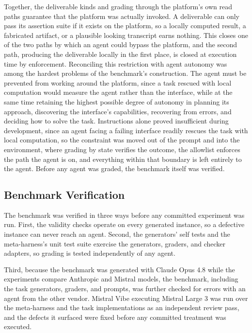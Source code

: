 \documentclass[
english,                 %
bibtex,                  %
]{kththesis}
\numberwithin{listing}{chapter}
\begin{document}
Together, the deliverable kinds and grading through the platform's own read paths guarantee that the platform was actually invoked. A deliverable can only pass its assertion suite if it exists on the platform, so a locally computed result, a fabricated artifact, or a plausible looking transcript earns nothing. This closes one of the two paths by which an agent could bypass the platform, and the second path, producing the deliverable locally in the first place, is closed at execution time by enforcement. Reconciling this restriction with agent autonomy was among the hardest problems of the benchmark's construction. The agent must be prevented from working around the platform, since a task rescued with local computation would measure the agent rather than the interface, while at the same time retaining the highest possible degree of autonomy in planning its approach, discovering the interface's capabilities, recovering from errors, and deciding how to solve the task. Instructions alone proved insufficient during development, since an agent facing a failing interface readily rescues the task with local computation, so the constraint was moved out of the prompt and into the environment, where grading by state verifies the outcome, the allowlist enforces the path the agent is on, and everything within that boundary is left entirely to the agent. Before any agent was graded, the benchmark itself was verified.

\subsection{Benchmark Verification}
\label{sec:method_benchmark_verification}
\glsresetall

The benchmark was verified in three ways before any committed experiment was run. First, the validity checks operate on every generated instance, so a defective instance can never reach an agent. Second, the generators' self tests and the meta-harness's unit test suite exercise the generators, graders, and checker adapters, so grading is tested independently of any agent.

Third, because the benchmark was generated with Claude Opus 4.8 while the experiments compare Anthropic and Mistral models, the benchmark, including the task generators, graders, and prompts, was further checked for errors with an agent from the other vendor. Mistral Vibe executing Mistral Large 3 was run over the meta-harness and the task implementations as an independent review pass, and the defects it surfaced were fixed before any committed treatment was executed.
\end{document}
